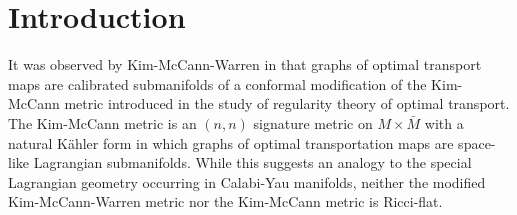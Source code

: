 \documentclass[12pt,letterpaper]{amsart}%
\numberwithin{mycounter}{section}
\theoremstyle{plain}
\numberwithin{equation}{section}
\theoremstyle{definition}
\begin{document}
\begin{abstract}

\end{abstract}
\maketitle

\tableofcontents


\section{Introduction}


It was observed by Kim-McCann-Warren in \cite{KMW} that graphs of optimal transport maps are calibrated submanifolds of a conformal modification of the Kim-McCann metric \cite{KM} introduced in the study of
regularity theory of optimal transport. The Kim-McCann metric is an $(n,n)$ signature metric on $M \times \bar{M}$ with a natural Kähler form in which graphs of optimal transportation maps are space-like Lagrangian submanifolds.   While this suggests an analogy to the special Lagrangian geometry occurring in Calabi-Yau manifolds, neither the modified Kim-McCann-Warren metric \cite{KMW} nor the Kim-McCann metric \cite{KM} is Ricci-flat.   
\end{document}
